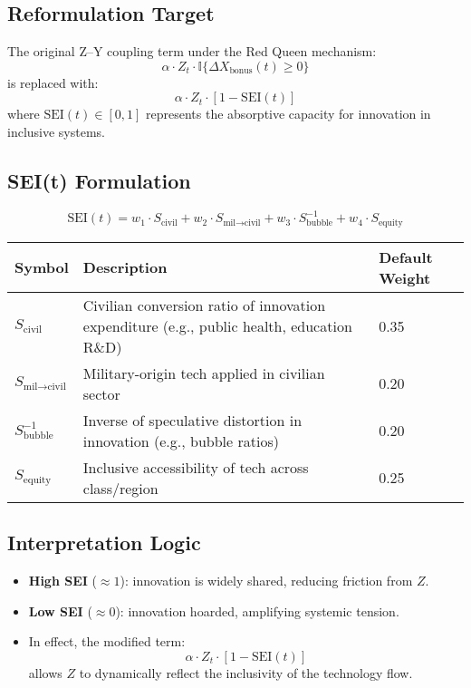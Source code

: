 \documentclass[12pt]{report}
\begin{document}
\subsection*{Reformulation Target}
The original Z–Y coupling term under the Red Queen mechanism:
\[
\alpha \cdot Z_t \cdot \mathbb{I} \{\Delta X_{\text{bonus}}(t) \geq 0\}
\]
is replaced with:
\[
\alpha \cdot Z_t \cdot \left[1 - \text{SEI}(t)\right]
\]
where $\text{SEI}(t) \in [0,1]$ represents the absorptive capacity for innovation in inclusive systems.

\subsection*{SEI(t) Formulation}
\[
\text{SEI}(t) = w_1 \cdot S_{\text{civil}} + w_2 \cdot S_{\text{mil} \rightarrow \text{civil}} + w_3 \cdot S_{\text{bubble}}^{-1} + w_4 \cdot S_{\text{equity}}
\]

\begin{table}[H]
\centering
\begin{tabular}{|l|p{6.5cm}|p{3.5cm}|}
\hline
\textbf{Symbol} & \textbf{Description} & \textbf{Default Weight} \\
\hline
$S_{\text{civil}}$ & Civilian conversion ratio of innovation expenditure (e.g., public health, education R\&D) & 0.35 \\
$S_{\text{mil} \rightarrow \text{civil}}$ & Military-origin tech applied in civilian sector & 0.20 \\
$S_{\text{bubble}}^{-1}$ & Inverse of speculative distortion in innovation (e.g., bubble ratios) & 0.20 \\
$S_{\text{equity}}$ & Inclusive accessibility of tech across class/region & 0.25 \\
\hline
\end{tabular}
\end{table}

\subsection*{Interpretation Logic}
\begin{itemize}
  \item \textbf{High SEI} ($\approx 1$): innovation is widely shared, reducing friction from $Z$.
  \item \textbf{Low SEI} ($\approx 0$): innovation hoarded, amplifying systemic tension.
  \item In effect, the modified term:
  \[
  \alpha \cdot Z_t \cdot \left[1 - \text{SEI}(t)\right]
  \]
  allows $Z$ to dynamically reflect the inclusivity of the technology flow.
\end{itemize}
\end{document}
